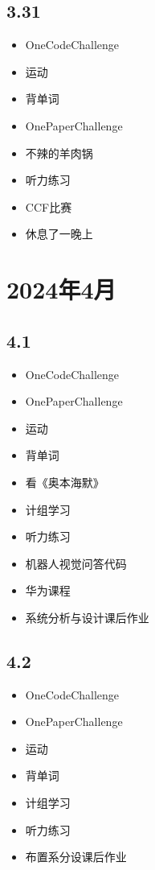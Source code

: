 \documentclass[UTF8]{ctexart}
\begin{document}
\subsection*{3.31}
\begin{itemize}
    \item OneCodeChallenge
    \item 运动
    \item 背单词
    \item OnePaperChallenge
    \item 不辣的羊肉锅
    \item 听力练习
    \item CCF比赛
    \item 休息了一晚上
\end{itemize}

\section*{2024年4月}

\subsection*{4.1}
\begin{itemize}
    \item OneCodeChallenge
    \item OnePaperChallenge
    \item 运动
    \item 背单词
    \item 看《奥本海默》
    \item 计组学习
    \item 听力练习
    \item 机器人视觉问答代码
    \item 华为课程
    \item 系统分析与设计课后作业
\end{itemize}

\subsection*{4.2}
\begin{itemize}
    \item OneCodeChallenge
    \item OnePaperChallenge
    \item 运动
    \item 背单词
    \item 计组学习
    \item 听力练习
    \item 布置系分设课后作业
\end{itemize}
\end{document}
